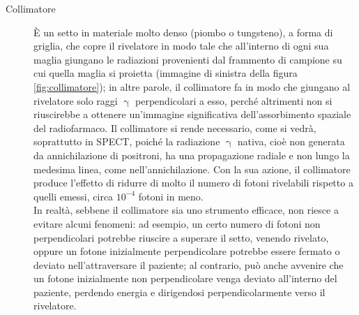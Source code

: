 \documentclass{report}
\newcommand{\figref}[1]{figura \ref{#1}}
\numberwithin{equation}{section}
\numberwithin{figure}{section}
\begin{document}
\begin{description}
    \item[Collimatore] È un setto in materiale molto denso (piombo o tungsteno), a forma di griglia, che copre il rivelatore in modo tale che all'interno di ogni sua maglia giungano le radiazioni provenienti dal frammento di campione su cui quella maglia si proietta (immagine di sinistra della \figref{fig:collimatore}); in altre parole, il collimatore fa in modo che giungano al rivelatore solo raggi $\upgamma$ perpendicolari a esso, perché altrimenti non si riuscirebbe a ottenere un'immagine significativa dell'assorbimento spaziale del radiofarmaco. Il collimatore si rende necessario, come si vedrà, soprattutto in SPECT, poiché la radiazione $\upgamma$ nativa, cioè non generata da annichilazione di positroni, ha una propagazione radiale e non lungo la medesima linea, come nell'annichilazione. Con la sua azione, il collimatore produce l'effetto di ridurre di molto il numero di fotoni rivelabili rispetto a quelli emessi, circa $10^{-4}$ fotoni in meno.\\
    In realtà, sebbene il collimatore sia uno strumento efficace, non riesce a evitare alcuni fenomeni: ad esempio, un certo numero di fotoni non perpendicolari potrebbe riuscire a superare il setto, venendo rivelato, oppure un fotone inizialmente perpendicolare potrebbe essere fermato o deviato nell'attraversare il paziente; al contrario, può anche avvenire che un fotone inizialmente non perpendicolare venga deviato all'interno del paziente, perdendo energia e dirigendosi perpendicolarmente verso il rivelatore.

\end{description}
\end{document}
